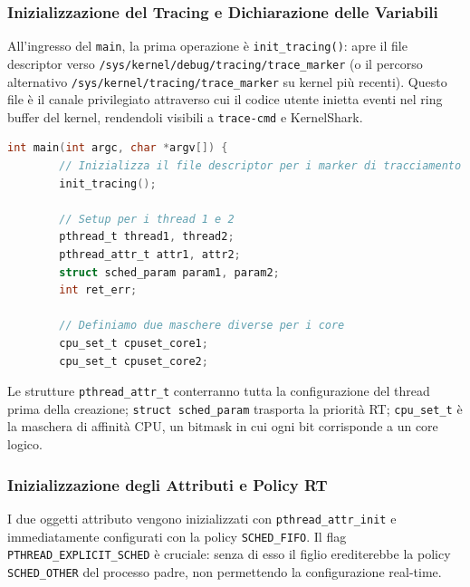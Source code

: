 \subsubsection{Inizializzazione del Tracing e Dichiarazione delle Variabili}

All'ingresso del \texttt{main}, la prima operazione è \texttt{init\_tracing()}: apre il
file descriptor verso \texttt{/sys/kernel/debug/tracing/trace\_marker} (o il percorso
alternativo \texttt{/sys/kernel/tracing/trace\_marker} su kernel più recenti). Questo file
è il canale privilegiato attraverso cui il codice utente inietta eventi nel ring buffer del
kernel, rendendoli visibili a \texttt{trace-cmd} e KernelShark.

\begin{lstlisting}[language=C, caption={\texttt{app10g.c} -- apertura del tracing e variabili}]
	int main(int argc, char *argv[]) {
		// Inizializza il file descriptor per i marker di tracciamento
		init_tracing();
		
		// Setup per i thread 1 e 2
		pthread_t thread1, thread2;
		pthread_attr_t attr1, attr2;
		struct sched_param param1, param2;
		int ret_err;
		
		// Definiamo due maschere diverse per i core
		cpu_set_t cpuset_core1;
		cpu_set_t cpuset_core2;
	\end{lstlisting}
	
	Le strutture \texttt{pthread\_attr\_t} conterranno tutta la configurazione del thread prima
	della creazione; \texttt{struct sched\_param} trasporta la priorità RT; \texttt{cpu\_set\_t}
	è la maschera di affinità CPU, un bitmask in cui ogni bit corrisponde a un core logico.
	
	\subsubsection{Inizializzazione degli Attributi e Policy RT}
	
	I due oggetti attributo vengono inizializzati con \texttt{pthread\_attr\_init} e
	immediatamente configurati con la policy \texttt{SCHED\_FIFO}.
	Il flag \texttt{PTHREAD\_EXPLICIT\_SCHED} è cruciale: senza di esso il figlio
	erediterebbe la policy \texttt{SCHED\_OTHER}  del processo padre, non permettendo la configurazione real-time.
	
